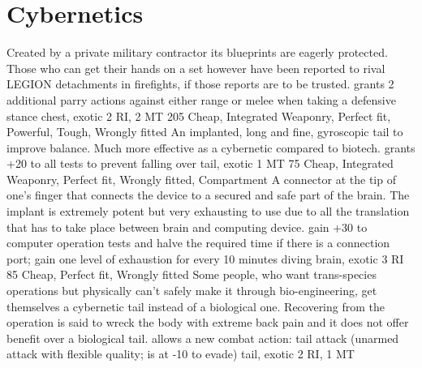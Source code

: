\documentclass[12pt,a4paper,openany,usenames,dvipsnames]{book}
\begin{document}
    \section{Cybernetics}
        {Created by a private military contractor its blueprints are eagerly protected. Those who can get their hands on a set however have been reported to rival LEGION detachments in firefights, if those reports are to be trusted.}
        {grants 2 additional parry actions against either range or melee when taking a defensive stance}
        {chest, exotic}
        {2 RI, 2 MT}
        {205}
        {Cheap, Integrated Weaponry, Perfect fit, Powerful, Tough, Wrongly fitted}
        {An implanted, long and fine, gyroscopic tail to improve balance. Much more effective as a cybernetic compared to biotech.}
        {grants +20 to all tests to prevent falling over}
        {tail, exotic}
        {1 MT}
        {75}
        {Cheap, Integrated Weaponry, Perfect fit, Wrongly fitted, Compartment}
        {A connector at the tip of one's finger that connects the device to a secured and safe part of the brain. The implant is extremely potent but very exhausting to use due to all the translation that has to take place between brain and computing device.}
        {gain +30 to computer operation tests and halve the required time if there is a connection port; gain one level of exhaustion for every 10 minutes diving}
        {brain, exotic}
        {3 RI}
        {85}
        {Cheap, Perfect fit, Wrongly fitted}
        {Some people, who want trans-species operations but physically can't safely make it through bio-engineering, get themselves a cybernetic tail instead of a biological one. Recovering from the operation is said to wreck the body with extreme back pain and it does not offer benefit over a biological tail.}
        {allows a new combat action: tail attack (unarmed attack with flexible quality; is at -10 to evade)}
        {tail, exotic}
        {2 RI, 1 MT}
\end{document}
